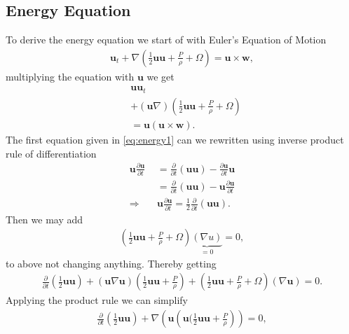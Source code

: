 \subsection{Energy Equation}
To derive the energy equation we start of with Euler's Equation of Motion
\begin{align}
  \mathbf{u} _t + \nabla
  (\frac{1}{2}\mathbf{u}\mathbf{u}+\frac{P}{\rho}+\Omega) = \mathbf{u}\times
  \mathbf{w},
\end{align}
multiplying the equation with $\mathbf{u}$ we get
\begin{align}
  &\mathbf{u}\mathbf{u} _t \label{eq:energy1} \\
  &+(\mathbf{u}\nabla)(\frac{1}{2}\mathbf{u}\mathbf{u}+\frac{P}{\rho}+\Omega)\label{eq:energy2}\\
  &= \mathbf{u}(\mathbf{u}\times
  \mathbf{w})\label{eq:energy3}.
\end{align}
The first equation given in \ref{eq:energy1} can we rewritten using inverse
product rule of differentiation
\begin{align}
    \mathbf{u}\frac{\partial \mathbf{u}}{\partial t}
    &= \frac{\partial
    }{\partial t} (\mathbf{u}\mathbf{u}) - \frac{\partial \mathbf{u}}{\partial t}
    \mathbf{u} \\
    &= \frac{\partial
    }{\partial t} (\mathbf{u}\mathbf{u}) - \mathbf{u}\frac{\partial
    \mathbf{u}}{\partial t}\\
    \Rightarrow\quad & \mathbf{u} \frac{\partial \mathbf{u}}{\partial t}  =
    \frac{1}{2}\frac{\partial }{\partial t} (\mathbf{u}\mathbf{u}).
\end{align}
Then we may add
\begin{align}
    \left(\frac{1}{2} \mathbf{u}\mathbf{u}+\frac{P}{\rho} +\Omega  \right)
    \underbrace{(\nabla u)}_{=0} = 0,
\end{align}
to above not changing anything. Thereby getting
\begin{align}
    \frac{\partial }{\partial t} (\frac{1}{2}\mathbf{u}\mathbf{u})
    +(\mathbf{u}\nabla \mathbf{u})\left(
    \frac{1}{2}\mathbf{u}\mathbf{u}+\frac{P}{\rho} \right)
    +\left( \frac{1}{2}\mathbf{u}\mathbf{u}+\frac{P}{\rho} + \Omega \right)
    (\nabla \mathbf{u}) = 0.
\end{align}
Applying the product rule we can simplify
\begin{align}
    \frac{\partial }{\partial t} \left(\frac{1}{2}\mathbf{u}\mathbf{u}\right)
    +\nabla \left(\mathbf{u}\left(\mathbf{u}(
    \frac{1}{2}\mathbf{u}\mathbf{u}+\frac{P}{\rho}\right) \right) = 0,
\end{align}
